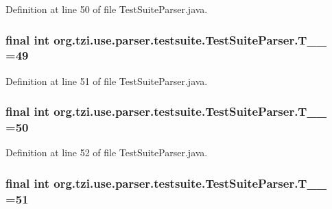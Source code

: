 Definition at line 50 of file Test\-Suite\-Parser.\-java.

\hypertarget{classorg_1_1tzi_1_1use_1_1parser_1_1testsuite_1_1_test_suite_parser_a3cbaeef0361cb06718af841dd29f04f0}{
\subsubsection[{T\-\_\-\-\_\-49}]{\setlength{\rightskip}{0pt plus 5cm}final int org.\-tzi.\-use.\-parser.\-testsuite.\-Test\-Suite\-Parser.\-T\-\_\-\-\_ =49\hspace{0.3cm}{\ttfamily [static]}}}\label{classorg_1_1tzi_1_1use_1_1parser_1_1testsuite_1_1_test_suite_parser_a3cbaeef0361cb06718af841dd29f04f0}


Definition at line 51 of file Test\-Suite\-Parser.\-java.

\hypertarget{classorg_1_1tzi_1_1use_1_1parser_1_1testsuite_1_1_test_suite_parser_a250da1c915306606296293c6b398f37e}{
\subsubsection[{T\-\_\-\-\_\-50}]{\setlength{\rightskip}{0pt plus 5cm}final int org.\-tzi.\-use.\-parser.\-testsuite.\-Test\-Suite\-Parser.\-T\-\_\-\-\_ =50\hspace{0.3cm}{\ttfamily [static]}}}\label{classorg_1_1tzi_1_1use_1_1parser_1_1testsuite_1_1_test_suite_parser_a250da1c915306606296293c6b398f37e}


Definition at line 52 of file Test\-Suite\-Parser.\-java.

\hypertarget{classorg_1_1tzi_1_1use_1_1parser_1_1testsuite_1_1_test_suite_parser_a689feacf30dab824b630c86863883729}{
\subsubsection[{T\-\_\-\-\_\-51}]{\setlength{\rightskip}{0pt plus 5cm}final int org.\-tzi.\-use.\-parser.\-testsuite.\-Test\-Suite\-Parser.\-T\-\_\-\-\_ =51\hspace{0.3cm}{\ttfamily [static]}}}\label{classorg_1_1tzi_1_1use_1_1parser_1_1testsuite_1_1_test_suite_parser_a689feacf30dab824b630c86863883729}


